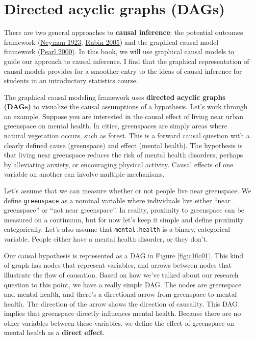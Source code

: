 \documentclass[
]{book}
\begin{document}
\section{Directed acyclic graphs (DAGs)}\label{directed-acyclic-graphs-dags}

There are two general approaches to \textbf{causal inference}: the potential outcomes framework (\href{https://www.jstor.org/stable/2245382}{Neyman 1923}, \href{https://www.jstor.org/stable/27590541}{Rubin 2005}) and the graphical causal model framework (\href{https://bayes.cs.ucla.edu/BOOK-2K/}{Pearl 2000}). In this book, we will use graphical causal models to guide our approach to causal inference. I find that the graphical representation of causal models provides for a smoother entry to the ideas of causal inference for students in an introductory statistics course.

The graphical causal modeling framework uses \textbf{directed acyclic graphs (DAGs)} to visualize the causal assumptions of a hypothesis. Let's work through an example. Suppose you are interested in the causal effect of living near urban greenspace on mental health. In cities, greenspaces are simply areas where natural vegetation occurs, such as forest. This is a forward causal question with a clearly defined cause (greenspace) and effect (mental health). The hypothesis is that living near greenspace reduces the risk of mental health disorders, perhaps by alleviating anxiety, or encouraging physical activity. Causal effects of one variable on another can involve multiple mechanisms.

Let's assume that we can measure whether or not people live near greenspace. We define \texttt{greenspace} as a nominal variable where individuals live either ``near greenspace'' or ``not near greenspace''. In reality, proximity to greenspace can be measured on a continuum, but for now let's keep it simple and define proximity categorically. Let's also assume that \texttt{mental.health} is a binary, categorical variable. People either have a mental health disorder, or they don't.

Our causal hypothesis is represented as a DAG in Figure \ref{fig:c10c01}. This kind of graph has nodes that represent variables, and arrows between nodes that illustrate the flow of causation. Based on how we've talked about our research question to this point, we have a really simple DAG. The nodes are greenspace and mental health, and there's a directional arrow from greenspace to mental health. The direction of the arrow shows the direction of causality. This DAG implies that greenspace directly influences mental health. Because there are no other variables between these variables, we define the effect of greenspace on mental health as a \textbf{direct effect}.
\end{document}
